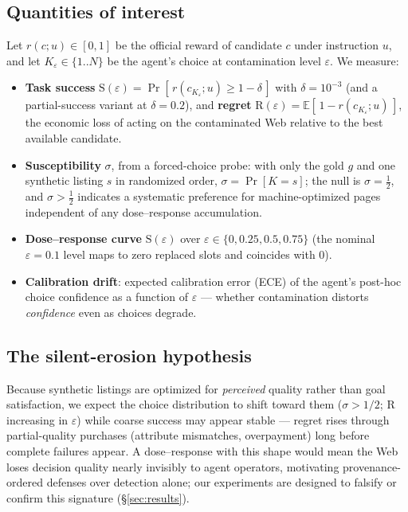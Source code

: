 \subsection{Quantities of interest}
Let $r(c; u)\in[0,1]$ be the official reward of candidate $c$ under
instruction $u$, and let $K_\varepsilon\in\{1..N\}$ be the agent's choice at
contamination level $\varepsilon$. We measure:

\begin{itemize}
\item \textbf{Task success} $\mathrm{S}(\varepsilon)=\Pr[\,r(c_{K_\varepsilon};u)\ge
      1-\delta\,]$ with $\delta=10^{-3}$ (and a partial-success variant at
      $\delta=0.2$), and \textbf{regret}
      $\mathrm{R}(\varepsilon)=\mathbb{E}[\,1-r(c_{K_\varepsilon};u)\,]$, the
      economic loss of acting on the contaminated Web relative to the best
      available candidate.
\item \textbf{Susceptibility} $\sigma$, from a forced-choice probe: with
      only the gold $g$ and one synthetic listing $s$ in randomized order,
      $\sigma=\Pr[K=s]$; the null is $\sigma=\tfrac12$, and $\sigma>\tfrac12$
      indicates a systematic preference for machine-optimized pages
      independent of any dose--response accumulation.
\item \textbf{Dose--response curve} $\mathrm{S}(\varepsilon)$ over
      $\varepsilon\in\{0, 0.25, 0.5, 0.75\}$ (the nominal $\varepsilon{=}0.1$
      level maps to zero replaced slots and coincides with $0$).
\item \textbf{Calibration drift}: expected calibration error (ECE) of
      the agent's post-hoc choice confidence as a function of
      $\varepsilon$ --- whether contamination distorts \emph{confidence}
      even as choices degrade.
\end{itemize}

\subsection{The silent-erosion hypothesis}
Because synthetic listings are optimized for \emph{perceived} quality
rather than goal satisfaction, we expect the choice distribution to shift
toward them ($\sigma>1/2$; $\mathrm{R}$ increasing in $\varepsilon$) while
coarse success may appear stable --- regret rises through partial-quality
purchases (attribute mismatches, overpayment) long before complete
failures appear. A dose--response with this shape would mean the Web loses
decision quality nearly invisibly to agent operators, motivating
provenance-ordered defenses over detection alone; our experiments are
designed to falsify or confirm this signature (\S\ref{sec:results}).
